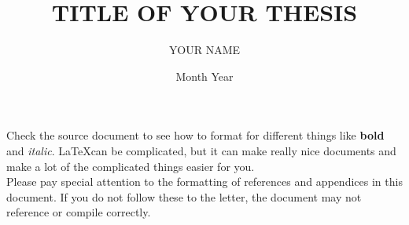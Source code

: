 \documentclass[authoryear,biblatex]{unketd}
\title{TITLE OF YOUR THESIS}
\author{YOUR NAME}
\date{Month Year}
\begin{document}
	\maketitle
	
	
	\makecopyright
	\makededication
	\makeepigraph
	
	\abstract
	
	Check the source document to see how to format for different things like \textbf{bold} and \textit{italic}. \LaTeX can be complicated, but it can make really nice documents and make a lot of the complicated things easier for you.
	\ \\
	Please pay special attention to the formatting of references and appendices in this document. If you do not follow these to the letter, the document may not reference or compile correctly.
	
	\acknowledgments
	
	\lipsum[1]

	\tableofcontents
	\listoffigures
	\listoftables
	
	\mainmatter
	
	
	
	
	\begin{appendices}
		
	\end{appendices}
	
	\printbibliography[heading=bibintoc,title={References}]
	
	
\end{document}
